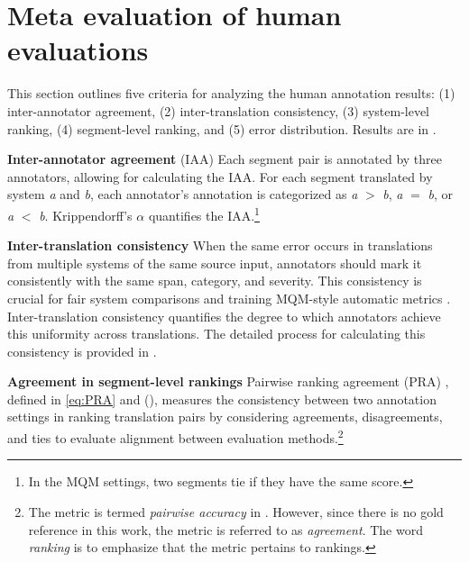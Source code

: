 \section{Meta evaluation of human evaluations}\label{sec:meta_eval_metrics}

% 

This section outlines five criteria for analyzing the human annotation results: (1) inter-annotator agreement, (2) inter-translation consistency, (3) system-level ranking, (4) segment-level ranking, and (5) error distribution. Results are in .

\noindent\textbf{Inter-annotator agreement} (IAA) Each segment pair is annotated by three annotators, allowing for calculating the IAA. For each segment translated by system \textit{a} and \textit{b}, each annotator's annotation is categorized as \textit{a} $>$ \textit{b}, \textit{a} $=$ \textit{b}, or \textit{a} $<$ \textit{b}.
Krippendorff's $\alpha$ \citep{krippendorff2018content} quantifies the IAA.\footnote{In the MQM settings, two segments tie if they have the same score.}

\noindent\textbf{Inter-translation consistency} When the same error occurs in translations from multiple systems of the same source input, annotators should mark it consistently with the same span, category, and severity. This consistency is crucial for fair system comparisons and training MQM-style automatic metrics \citep{juraska-etal-2023-metricx, fernandes-etal-2023-devil}. Inter-translation consistency quantifies the degree to which annotators achieve this uniformity across translations. The detailed process for calculating this consistency is provided in .

\noindent\textbf{Agreement in segment-level rankings} Pairwise ranking agreement (PRA) \citep{deutsch-etal-2023-ties}, defined in \eqref{eq:PRA} and  (), measures the consistency between two annotation settings in ranking translation pairs by considering agreements, disagreements, and ties to evaluate alignment between evaluation methods.\footnote{The metric is termed \textit{pairwise accuracy} in \citet{deutsch-etal-2023-ties}. However, since there is no gold reference in this work, the metric is referred to as \textit{agreement}. The word \textit{ranking} is to emphasize that the metric pertains to rankings.}

